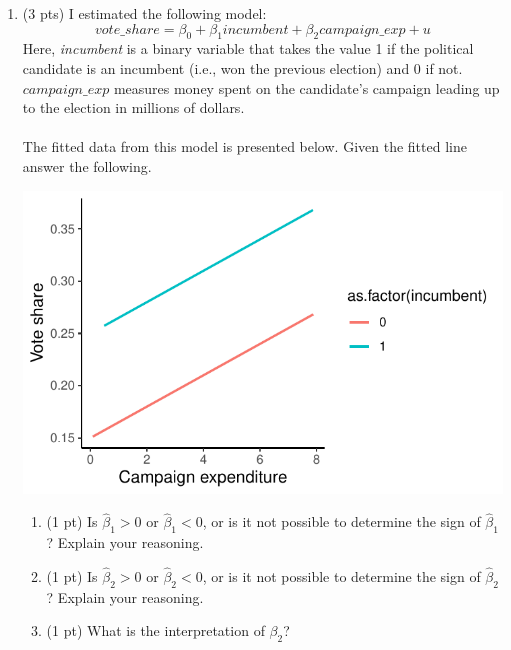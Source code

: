 \documentclass{./../../Latex/tests}
\begin{document}
\begin{enumerate}
 \item (3 pts) I estimated the following model:
$$ vote\_share = \beta_0 + \beta_1 incumbent + \beta_2 campaign\_exp +u  $$
Here, \textit{incumbent} is a binary variable that takes the value 1 if the political candidate is an incumbent (i.e., won the previous election) and 0 if not. $campaign\_exp$ measures money spent on the candidate's campaign leading up to the election in millions of dollars. \\~\\
The fitted data from this model is presented below. Given the fitted line answer the following.
\begin{center}
	\includegraphics{./../../output/sample_final_incmb.pdf}
\end{center}
\begin{enumerate}
  \item (1 pt) Is $\hat{\beta}_1>0$ or $\hat{\beta}_1<0$, or is it not possible to determine the sign of $\hat{\beta}_1$? Explain your reasoning. 
  \item (1 pt) Is $\hat{\beta}_2>0$ or $\hat{\beta}_2<0$, or is it not possible to determine the sign of $\hat{\beta}_2$? Explain your reasoning. 
  \item (1 pt) What is the interpretation of $\beta_2$? 
\end{enumerate}

\end{enumerate}
\end{document}
